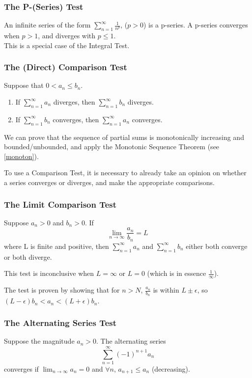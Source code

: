 \documentclass{article}
\begin{document}
\subsubsection{The P-(Series) Test} An infinite series of the form $\sum_{n=1}^{\infty} \frac{1}{n^p}$, ($p>0$) is a p-series. A p-series converges when $p > 1$, and diverges with $p \le 1$.\\
This is a special case of the Integral Test.

\subsubsection{The (Direct) Comparison Test}
Suppose that $0 < a_n \le b_n$.
\begin{enumerate}
    \item If $\sum_{n=1}^{\infty} a_n$ diverges, then $\sum_{n=1}^{\infty} b_n$ diverges.
    \item If $\sum_{n=1}^{\infty} b_n$ converges, then $\sum_{n=1}^{\infty} a_n$ converges.
\end{enumerate}
We can prove that the sequence of partial sums is monotonically increasing and bounded/unbounded, and apply the Monotonic Sequence Theorem (see \ref{monoton}).

To use a Comparison Test, it is necessary to already take an opinion on whether a series converges or diverges, and make the appropriate comparisons.

\subsubsection{The Limit Comparison Test}
Suppose $a_n > 0$ and $b_n > 0$. If $$\lim_{n\to\infty}\frac{a_n}{b_n} = L$$ where L is finite and positive, then $\sum_{n=1}^{\infty} a_n$ and $\sum_{n=1}^{\infty} b_n$ either both converge or both diverge.

This test is inconclusive when $L = \infty$ or $L = 0$ (which is in essence $\frac{1}{\infty}$).

The test is proven by showing that for $n > N$, $\frac{a_n}{b_n}$ is within $L \pm \epsilon$, so $\left(L - \epsilon\right)b_n < a_n < \left(L + \epsilon\right)b_n$.

\subsubsection{The Alternating Series Test}
Suppose the magnitude $a_n > 0$. The alternating series $$\sum_{n=1}^{\infty} (-1)^{n+1}a_n$$ converges if $\lim_{n \to \infty} a_n = 0$ and $\forall n$, $a_{n+1} \le a_n$ (decreasing).
\end{document}
